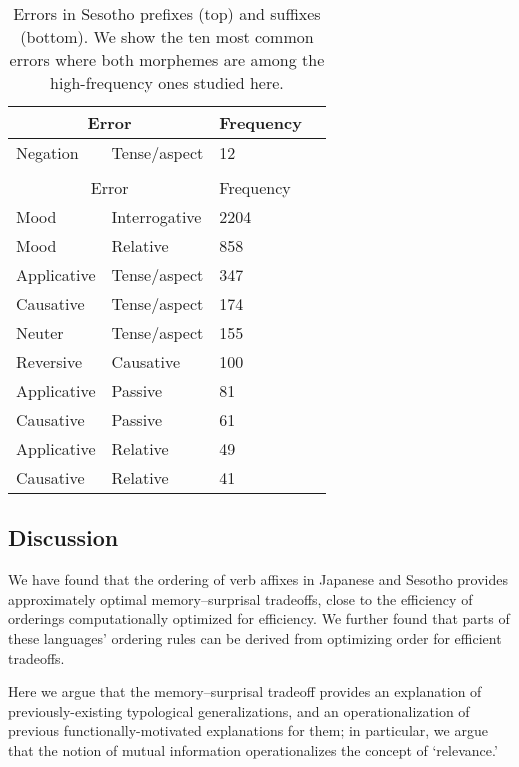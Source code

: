\begin{table}
    \centering
    \begin{tabular}{ll|ll}
    \multicolumn{2}{c|}{Error} & Frequency \\ \hline\hline
Negation & Tense/aspect & 12 \\
\\
    \multicolumn{2}{c|}{Error} & Frequency \\ \hline\hline
Mood & Interrogative & 2204 \\
Mood & Relative & 858 \\
Applicative & Tense/aspect & 347 \\
Causative & Tense/aspect & 174 \\
Neuter & Tense/aspect & 155 \\
Reversive & Causative & 100 \\
Applicative & Passive & 81 \\
Causative & Passive & 61 \\
Applicative & Relative & 49 \\
Causative & Relative & 41 \\
\end{tabular}
    \caption{Errors in Sesotho prefixes (top) and suffixes (bottom). %
    We show the ten most common errors where both morphemes are among the high-frequency ones studied here.}
    \label{tab:sesotho-prefix-err-analysis}
\end{table}











\subsection{Discussion}
We have found that the ordering of verb affixes in Japanese and Sesotho provides approximately optimal memory--surprisal tradeoffs, close to the efficiency of orderings computationally optimized for efficiency.
We further found that parts of these languages' ordering rules can be derived from optimizing order for efficient tradeoffs.

Here we argue that the memory--surprisal tradeoff provides an explanation of previously-existing typological generalizations, and an operationalization of previous functionally-motivated explanations for them; in particular, we argue that the notion of mutual information operationalizes the concept of `relevance.'

